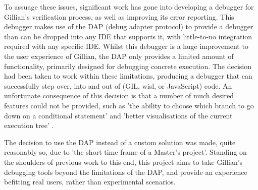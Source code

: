 To assuage these issues, significant work has gone into developing a debugger for Gillian's verification process, as well as improving its error reporting. This debugger makes use of the DAP (debug adapter protocol) to provide a debugger than can be dropped into any IDE that supports it, with little-to-no integration required with any specific IDE. Whilst this debugger is a huge improvement to the user experience of Gillian, the DAP only provides a limited amount of functionality, primarily designed for debugging concrete execution. The decision had been taken to work within these limitations, producing a debugger that can successfully step over, into and out of (GIL, wisl, or JavaScript) code. An unfortunate consequence of this decision is that a number of much desired features could not be provided, such as 'the ability to choose which branch to go down on a conditional statement' and 'better visualisations of the current execution tree' \cite[p.~49]{gillian-debugging-2021}.

The decision to use the DAP instead of a custom solution was made, quite reasonably so, due to 'the short time frame of a Master’s project'. Standing on the shoulders of previous work to this end, this project aims to take Gillian's debugging tools beyond the limitations of the DAP, and provide an experience befitting real users, rather than experimental scenarios.
